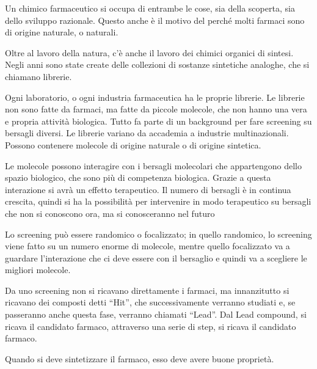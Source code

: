Un chimico farmaceutico si occupa di entrambe le cose, sia della
scoperta, sia dello sviluppo razionale.
Questo anche è il motivo del perché molti farmaci sono di origine
naturale, o naturali.

Oltre al lavoro della natura, c'è anche il lavoro dei chimici organici
di sintesi. Negli anni sono state create delle collezioni di sostanze
sintetiche analoghe, che si chiamano librerie.

Ogni laboratorio, o ogni industria farmaceutica ha le proprie librerie.
Le librerie non sono fatte da farmaci, ma fatte da piccole molecole, che
non hanno una vera e propria attività biologica. Tutto fa parte di un
background per fare screening su bersagli diversi.
Le librerie variano da accademia a industrie multinazionali.
Possono contenere molecole di origine naturale o di origine sintetica.

Le molecole possono interagire con i bersagli molecolari che
appartengono dello spazio biologico, che sono più di competenza
biologica.
Grazie a questa interazione si avrà un effetto terapeutico.
Il numero di bersagli è in continua crescita, quindi si ha la
possibilità per intervenire in modo terapeutico su bersagli che non si
conoscono ora, ma si conosceranno nel futuro

Lo screening può essere randomico o focalizzato; in quello randomico, lo
screening viene fatto su un numero enorme di molecole, mentre quello
focalizzato va a guardare l'interazione che ci deve essere con il
bersaglio e quindi va a scegliere le migliori molecole.

Da uno screening non si ricavano direttamente i farmaci, ma innanzitutto
si ricavano dei composti detti ``Hit'', che successivamente verranno
studiati e, se passeranno anche questa fase, verranno chiamati ``Lead''.
Dal Lead compound, si ricava il candidato farmaco, attraverso una serie
di step, si ricava il candidato farmaco.

Quando si deve sintetizzare il farmaco, esso deve avere buone
proprietà.